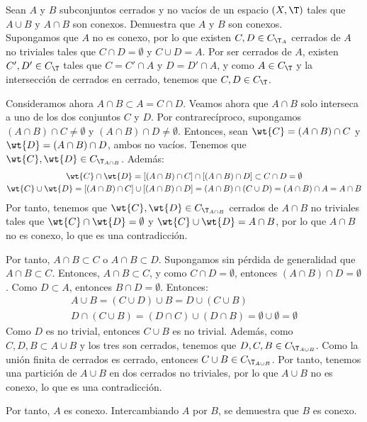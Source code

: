 \begin{ejercicio}
    Sean $A$ y $B$ subconjuntos cerrados y no vacíos de un espacio $(X, \T)$ tales que $A \cup B$ y $A \cap B$ son conexos. Demuestra que $A$ y $B$ son conexos.\\

    Supongamos que $A$ no es conexo, por lo que existen $C,D\in C_{\T_A}$ cerrados de $A$ no triviales tales que $C\cap D = \emptyset$ y $C\cup D = A$.
    Por ser cerrados de $A$, existen $C',D'\in C_{\T}$ tales que $C=C'\cap A$ y $D=D'\cap A$,
    y como $A\in C_{\T}$ y la intersección de cerrados en cerrado, tenemos que $C,D\in C_\T$.

    Consideramos ahora $A\cap B\subset A=C\cap D$. Veamos ahora que $A\cap B$ solo interseca a uno de los dos conjuntos $C$ y $D$.
    Por contrarecíproco, supongamos $(A\cap B)\cap C\neq \emptyset$ y $(A\cap B)\cap D\neq \emptyset$. Entonces, sean $\wt{C}=(A\cap B)\cap C$ y $\wt{D}=(A\cap B)\cap D$, ambos no vacíos.
    Tenemos que $\wt{C},\wt{D}\in C_{\T_{A\cap B}}$. Además:
    \begin{gather*}
        \wt{C}\cap \wt{D}
        = [(A\cap B)\cap C] \cap [(A\cap B)\cap D] \subset C\cap D = \emptyset \\
        \wt{C}\cup \wt{D}
        = [(A\cap B)\cap C] \cup [(A\cap B)\cap D]
        = (A\cap B)\cap (C\cup D) = (A\cap B)\cap A = A\cap B
    \end{gather*}
    Por tanto, tenemos que $\wt{C},\wt{D}\in C_{\T_{A\cap B}}$ cerrados de $A\cap B$ no triviales tales que $\wt{C}\cap \wt{D}=\emptyset$ y $\wt{C}\cup \wt{D}=A\cap B$,
    por lo que $A\cap B$ no es conexo, lo que es una contradicción.

    Por tanto, $A\cap B\subset C$ o $A\cap B\subset D$.
    Supongamos sin pérdida de generalidad que $A\cap B\subset C$.
    Entonces, $A\cap B\subset C$, y como $C\cap D=\emptyset$, entonces $(A\cap B)\cap D = \emptyset$. Como $D\subset A$, entonces $B\cap D=\emptyset$. Entonces:
    \begin{gather*}
        A\cup B = (C\cup D)\cup B = D \cup (C\cup B)\\
        D\cap (C\cup B) = (D\cap C) \cup (D\cap B) = \emptyset \cup \emptyset = \emptyset
    \end{gather*}
    Como $D$ es no trivial, entonces $C\cup B$ es no trivial. Además, como $C,D,B\subset A\cup B$ y los tres son cerrados, tenemos que $D,C,B\in C_{\T_{A\cup B}}$.
    Como la unión finita de cerrados es cerrado, entonces $C\cup B\in C_{\T_{A\cup B}}$. Por tanto, tenemos una partición de $A\cup B$ en dos cerrados no triviales,
    por lo que $A\cup B$ no es conexo, lo que es una contradicción.
    
    Por tanto, $A$ es conexo. Intercambiando $A$ por $B$, se demuestra que $B$ es conexo.
\end{ejercicio}

